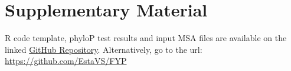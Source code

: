 \documentclass{article}[12pt]
\begin{document}
\section*{Supplementary Material}
\label{sec:supp}

R code template, phyloP test results and input MSA files are available on the linked \href{https://github.com/EstaVS/FYP}{GitHub Repository}. Alternatively, go to the url: \url{https://github.com/EstaVS/FYP}


\section*{}
\printbibliography
\end{document}
